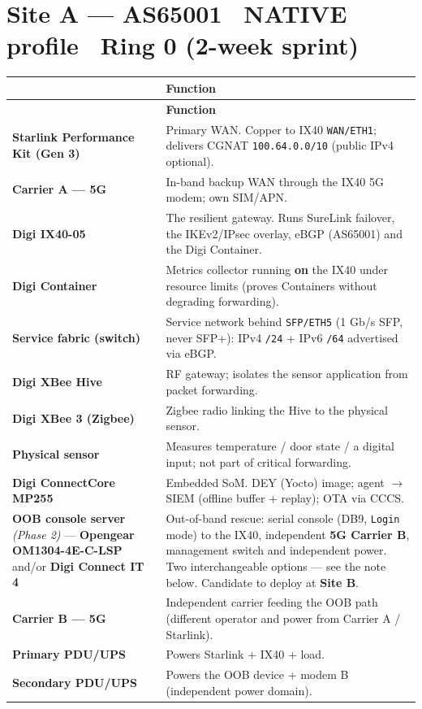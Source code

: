 \documentclass[10pt,letterpaper]{article}
\makeatletter
\newcommand{\kf}[1]{\textbf{\textcolor{PrimaryBlue}{#1}}}
\newcommand{\dtophead}{%
  \rowcolor{PrimaryBlue}{\color{white}\bfseries Device} & {\color{white}\bfseries Function}\\}
\newenvironment{devtable}{%
  \setlength{\arrayrulewidth}{0.4pt}\arrayrulecolor{black!15}%
  \renewcommand{\arraystretch}{1.28}%
  \begin{longtable}{@{}>{\raggedright\arraybackslash}p{4.4cm}@{\hspace{9pt}}>{\raggedright\arraybackslash}p{11.9cm}@{}}
  \dtophead \hline \endfirsthead \dtophead \hline \endhead}
  {\end{longtable}}
\makeatother
\begin{document}
\section{Site A --- AS65001 \textbullet\ NATIVE profile \textbullet\ Ring 0 (2-week sprint)}
\begin{devtable}
\textbf{Starlink Performance Kit (Gen 3)} & Primary WAN. Copper to IX40 \texttt{WAN/ETH1}; delivers CGNAT \texttt{100.64.0.0/10} (public IPv4 optional). \\ \hline
\textbf{Carrier A --- 5G} & In-band backup WAN through the IX40 5G modem; own SIM/APN. \\ \hline
\textbf{Digi IX40-05} & The resilient gateway. Runs SureLink failover, the IKEv2/IPsec overlay, eBGP (AS65001) and the Digi Container. \\ \hline
\textbf{Digi Container} & Metrics collector running \textbf{on} the IX40 under resource limits (proves Containers without degrading forwarding). \\ \hline
\textbf{Service fabric (switch)} & Service network behind \texttt{SFP/ETH5} (1 Gb/s SFP, never SFP+): IPv4 \texttt{/24} + IPv6 \texttt{/64} advertised via eBGP. \\ \hline
\textbf{Digi XBee Hive} & RF gateway; isolates the sensor application from packet forwarding. \\ \hline
\textbf{Digi XBee 3 (Zigbee)} & Zigbee radio linking the Hive to the physical sensor. \\ \hline
\textbf{Physical sensor} & Measures temperature / door state / a digital input; not part of critical forwarding. \\ \hline
\textbf{Digi ConnectCore MP255} & Embedded SoM. DEY (Yocto) image; agent $\rightarrow$ SIEM (offline buffer + replay); OTA via CCCS. \\ \hline
\textbf{OOB console server} \textit{(Phase 2)} --- \textbf{Opengear OM1304-4E-C-LSP} and/or \textbf{Digi Connect IT 4} & Out-of-band rescue: serial console (DB9, \texttt{Login} mode) to the IX40, independent \kf{5G Carrier B}, management switch and independent power. Two interchangeable options --- see the note below. Candidate to deploy at \kf{Site B}. \\ \hline
\textbf{Carrier B --- 5G} & Independent carrier feeding the OOB path (different operator and power from Carrier A / Starlink). \\ \hline
\textbf{Primary PDU/UPS} & Powers Starlink + IX40 + load. \\ \hline
\textbf{Secondary PDU/UPS} & Powers the OOB device + modem B (independent power domain). \\
\end{devtable}
\end{document}
